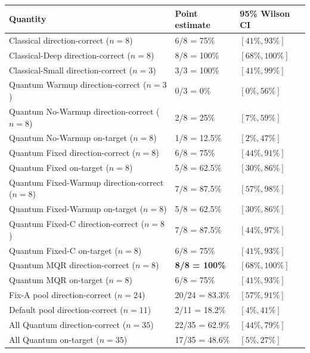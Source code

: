 \documentclass[10pt,a4paper]{article}
\begin{document}
\begin{center}
\setlength{\tabcolsep}{8pt}
\begin{tabular}{lll}
\toprule
Quantity & Point estimate & 95\% Wilson CI \\
\midrule
Classical direction-correct ($n=8$)         & 6/8 = 75\%      & $[41\%,93\%]$ \\
Classical-Deep direction-correct ($n=8$)    & 8/8 = 100\%    & $[68\%,100\%]$ \\
Classical-Small direction-correct ($n=3$)  & 3/3 = 100\%    & $[41\%,99\%]$ \\
\midrule
Quantum Warmup direction-correct ($n=3$)     & 0/3 = 0\%      & $[0\%,56\%]$ \\
Quantum No-Warmup direction-correct ($n=8$)  & 2/8 = 25\%   & $[7\%,59\%]$ \\
Quantum No-Warmup on-target ($n=8$)          & 1/8 = 12.5\%   & $[2\%,47\%]$ \\
\midrule
Quantum Fixed direction-correct ($n=8$)     & 6/8 = 75\%     & $[44\%,91\%]$ \\
Quantum Fixed on-target ($n=8$)              & 5/8 = 62.5\%     & $[30\%,86\%]$ \\
\midrule
Quantum Fixed-Warmup direction-correct ($n=8$) & 7/8 = 87.5\%   & $[57\%,98\%]$ \\
Quantum Fixed-Warmup on-target ($n=8$)        & 5/8 = 62.5\%     & $[30\%,86\%]$ \\
\midrule
Quantum Fixed-C direction-correct ($n=8$)   & 7/8 = 87.5\%     & $[44\%,97\%]$ \\
Quantum Fixed-C on-target ($n=8$)            & 6/8 = 75\%   & $[41\%,93\%]$ \\
\midrule
Quantum MQR direction-correct ($n=8$)      & \textbf{8/8 = 100\%} & $[68\%,100\%]$ \\
Quantum MQR on-target ($n=8$)                & 6/8 = 75\%     & $[41\%,93\%]$ \\
\midrule
Fix-A pool direction-correct ($n=24$)        & 20/24 = 83.3\% & $[57\%,91\%]$ \\
Default pool direction-correct ($n=11$)       & 2/11 = 18.2\%   & $[4\%,41\%]$ \\
\midrule
All Quantum direction-correct ($n=35$)      & 22/35 = 62.9\% & $[44\%,79\%]$ \\
All Quantum on-target ($n=35$)               &  17/35 = 48.6\% & $[5\%,27\%]$ \\
\bottomrule
\end{tabular}
\end{center}
\end{document}
